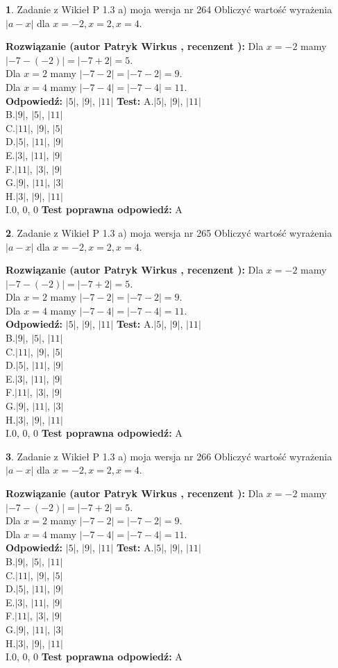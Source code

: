 \documentclass[12pt, a4paper]{article}
\theoremstyle{definition} %
\newtheorem{zad}{}
\newcommand{\zadStart}[1]{\begin{zad}#1\newline}
\newcommand{\zadStop}{\end{zad}}
\newcommand{\rozwStart}[2]{\noindent \textbf{Rozwiązanie (autor #1 , recenzent #2): }\newline}
\newcommand{\rozwStop}{\newline}
\newcommand{\odpStart}{\noindent \textbf{Odpowiedź:}\newline}
\newcommand{\odpStop}{\newline}
\newcommand{\testStart}{\noindent \textbf{Test:}\newline}
\newcommand{\testStop}{\newline}
\newcommand{\kluczStart}{\noindent \textbf{Test poprawna odpowiedź:}\newline}
\newcommand{\kluczStop}{\newline}
\begin{document}
\zadStart{Zadanie z Wikieł P 1.3 a) moja wersja nr 264}
Obliczyć wartość wyrażenia $|a - x|$ dla $x=-2,x=2,x=4$.
\zadStop
\rozwStart{Patryk Wirkus}{}
Dla $x = -2$ mamy $|-7 - (-2)| = |-7 + 2| = 5$.\\
Dla $x = 2$ mamy $|-7 - 2| = |-7 - 2| = 9$.\\
Dla $x = 4$ mamy $|-7 - 4| = |-7 - 4| = 11$.\\
\rozwStop
\odpStart
$|5|$, $|9|$, $|11|$
\odpStop
\testStart
A.$|5|$, $|9|$, $|11|$\\
B.$|9|$, $|5|$, $|11|$\\
C.$|11|$, $|9|$, $|5|$\\
D.$|5|$, $|11|$, $|9|$\\
E.$|3|$, $|11|$, $|9|$\\
F.$|11|$, $|3|$, $|9|$\\
G.$|9|$, $|11|$, $|3|$\\
H.$|3|$, $|9|$, $|11|$\\
I.$0$, $0$, $0$
\testStop
\kluczStart
A
\kluczStop



\zadStart{Zadanie z Wikieł P 1.3 a) moja wersja nr 265}
Obliczyć wartość wyrażenia $|a - x|$ dla $x=-2,x=2,x=4$.
\zadStop
\rozwStart{Patryk Wirkus}{}
Dla $x = -2$ mamy $|-7 - (-2)| = |-7 + 2| = 5$.\\
Dla $x = 2$ mamy $|-7 - 2| = |-7 - 2| = 9$.\\
Dla $x = 4$ mamy $|-7 - 4| = |-7 - 4| = 11$.\\
\rozwStop
\odpStart
$|5|$, $|9|$, $|11|$
\odpStop
\testStart
A.$|5|$, $|9|$, $|11|$\\
B.$|9|$, $|5|$, $|11|$\\
C.$|11|$, $|9|$, $|5|$\\
D.$|5|$, $|11|$, $|9|$\\
E.$|3|$, $|11|$, $|9|$\\
F.$|11|$, $|3|$, $|9|$\\
G.$|9|$, $|11|$, $|3|$\\
H.$|3|$, $|9|$, $|11|$\\
I.$0$, $0$, $0$
\testStop
\kluczStart
A
\kluczStop



\zadStart{Zadanie z Wikieł P 1.3 a) moja wersja nr 266}
Obliczyć wartość wyrażenia $|a - x|$ dla $x=-2,x=2,x=4$.
\zadStop
\rozwStart{Patryk Wirkus}{}
Dla $x = -2$ mamy $|-7 - (-2)| = |-7 + 2| = 5$.\\
Dla $x = 2$ mamy $|-7 - 2| = |-7 - 2| = 9$.\\
Dla $x = 4$ mamy $|-7 - 4| = |-7 - 4| = 11$.\\
\rozwStop
\odpStart
$|5|$, $|9|$, $|11|$
\odpStop
\testStart
A.$|5|$, $|9|$, $|11|$\\
B.$|9|$, $|5|$, $|11|$\\
C.$|11|$, $|9|$, $|5|$\\
D.$|5|$, $|11|$, $|9|$\\
E.$|3|$, $|11|$, $|9|$\\
F.$|11|$, $|3|$, $|9|$\\
G.$|9|$, $|11|$, $|3|$\\
H.$|3|$, $|9|$, $|11|$\\
I.$0$, $0$, $0$
\testStop
\kluczStart
A
\kluczStop
\end{document}
